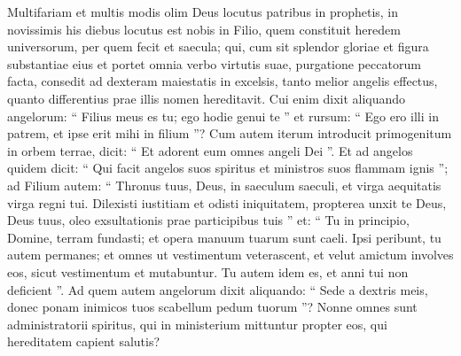 \begin{biblechapter}
 \verse Multifariam et multis modis olim Deus locutus patribus in prophetis, 
\verse in novissimis his diebus locutus est nobis in Filio, quem constituit heredem universorum, per quem fecit et saecula; 
\verse qui, cum sit splendor gloriae et figura substantiae eius et portet omnia verbo virtutis suae, purgatione peccatorum facta, consedit ad dexteram maiestatis in excelsis, 
\verse tanto melior angelis effectus, quanto differentius prae illis nomen hereditavit.
 \verse Cui enim dixit aliquando angelorum:
 “ Filius meus es tu;
 ego hodie genui te ”
 et rursum: “ Ego ero illi in patrem, et ipse erit mihi in filium ”?
 \verse Cum autem iterum introducit primogenitum in orbem terrae, dicit:
 “ Et adorent eum omnes angeli Dei ”.
 \verse Et ad angelos quidem dicit:
 “ Qui facit angelos suos spiritus
 et ministros suos flammam ignis ”;
 \verse ad Filium autem:
 “ Thronus tuus, Deus, in saeculum saeculi,
 et virga aequitatis virga regni tui.
 \verse Dilexisti iustitiam et odisti iniquitatem,
 propterea unxit te Deus, Deus tuus,
 oleo exsultationis prae participibus tuis ” 
\verse et:
 “ Tu in principio, Domine, terram fundasti;
 et opera manuum tuarum sunt caeli.
 \verse Ipsi peribunt, tu autem permanes;
 et omnes ut vestimentum veterascent,
 \verse et velut amictum involves eos,
 sicut vestimentum et mutabuntur.
 Tu autem idem es, et anni tui non deficient ”.
 \verse Ad quem autem angelorum dixit aliquando:
 “ Sede a dextris meis,
 donec ponam inimicos tuos scabellum pedum tuorum ”?
 \verse Nonne omnes sunt administratorii spiritus, qui in ministerium mittuntur propter eos, qui hereditatem capient salutis?
 

\end{biblechapter}
